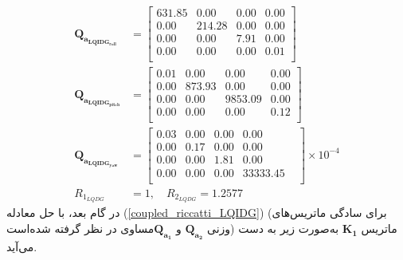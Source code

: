 \begin{equation}
	\begin{split}
				\boldsymbol{Q_{a_{LQIDG_{roll}}}} &= \begin{bmatrix}
			631.85 & 0.00 & 0.00 & 0.00  \\ 
			0.00 & 214.28 & 0.00 & 0.00  \\ 
			0.00 & 0.00 & 7.91 & 0.00  \\ 
			0.00 & 0.00 & 0.00 & 0.01  \\ 
		\end{bmatrix} \\
		\boldsymbol{Q_{a_{LQIDG_{pitch}}}} &= \begin{bmatrix}
			0.01 & 0.00 & 0.00 & 0.00  \\
			0.00 & 873.93 & 0.00 & 0.00  \\ 
			0.00 & 0.00 & 9853.09 & 0.00 \\ 
			0.00 & 0.00 & 0.00 & 0.12  \\ 
		\end{bmatrix}\\
			\boldsymbol{Q_{a_{LQIDG_{yaw}}}}  &= \begin{bmatrix}
0.03 & 0.00 & 0.00 & 0.00 & \\ 
0.00 & 0.17 & 0.00 & 0.00 & \\ 
0.00 & 0.00 & 1.81 & 0.00 & \\ 
0.00 & 0.00 & 0.00 & 33333.45 & \\
	\end{bmatrix}\times 10^{-4}\\  R_{1_{LQDG}} &= 1, \quad  R_{2_{LQDG}} = 1.2577
	\end{split}
\end{equation}
در گام بعد، با حل معادله
(\ref{coupled_riccatti_LQIDG})
(برای سادگی ماتریس‌های وزنی $\boldsymbol{{Q}_{a_2}}$ و $\boldsymbol{{Q}_{a_1}}$مساوی در نظر گرفته شده‌است)
ماتریس
$\boldsymbol{{K}_1}$
به‌صورت زیر به دست می‌آید.
